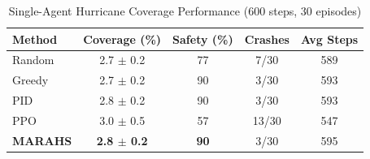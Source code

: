 \begin{table}[t]
\centering
\caption{Single-Agent Hurricane Coverage Performance (600 steps, 30 episodes)}
\label{tab:main}
\begin{tabular}{lcccc}
\toprule
Method & Coverage (\%) & Safety (\%) & Crashes & Avg Steps \\
\midrule
Random & 2.7 $\pm$ 0.2 & 77 & 7/30 & 589 \\
Greedy & 2.7 $\pm$ 0.2 & 90 & 3/30 & 593 \\
PID & 2.8 $\pm$ 0.2 & 90 & 3/30 & 593 \\
PPO & 3.0 $\pm$ 0.5 & 57 & 13/30 & 547 \\
\textbf{MARAHS} & \textbf{2.8 $\pm$ 0.2} & \textbf{90} & 3/30 & 595 \\
\bottomrule
\end{tabular}
\end{table}
